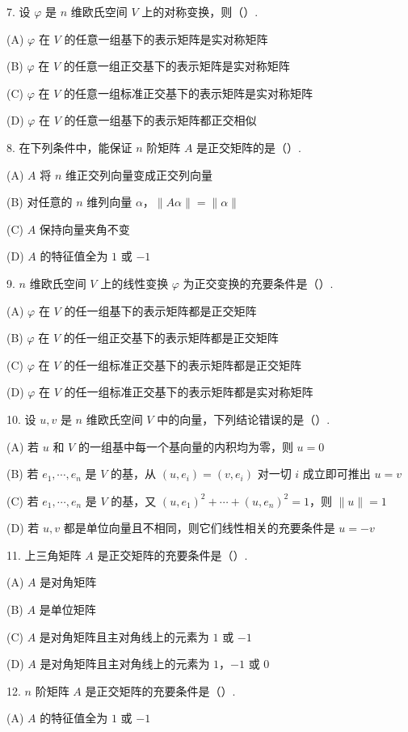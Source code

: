 \documentclass[UTF8,12pt,a4paper,fontset=fandol]{ctexart}
\begin{document}
7. 设 $\varphi$ 是 $n$ 维欧氏空间 $V$ 上的对称变换，则（\quad ）.

(A) $\varphi$ 在 $V$ 的任意一组基下的表示矩阵是实对称矩阵

(B) $\varphi$ 在 $V$ 的任意一组正交基下的表示矩阵是实对称矩阵

(C) $\varphi$ 在 $V$ 的任意一组标准正交基下的表示矩阵是实对称矩阵

(D) $\varphi$ 在 $V$ 的任意一组基下的表示矩阵都正交相似

8. 在下列条件中，能保证 $n$ 阶矩阵 $A$ 是正交矩阵的是（\quad ）.

(A) $A$ 将 $n$ 维正交列向量变成正交列向量

(B) 对任意的 $n$ 维列向量 $\alpha$，$\|A\alpha\|=\|\alpha\|$

(C) $A$ 保持向量夹角不变

(D) $A$ 的特征值全为 $1$ 或 $-1$

9. $n$ 维欧氏空间 $V$ 上的线性变换 $\varphi$ 为正交变换的充要条件是（\quad ）.

(A) $\varphi$ 在 $V$ 的任一组基下的表示矩阵都是正交矩阵

(B) $\varphi$ 在 $V$ 的任一组正交基下的表示矩阵都是正交矩阵

(C) $\varphi$ 在 $V$ 的任一组标准正交基下的表示矩阵都是正交矩阵

(D) $\varphi$ 在 $V$ 的任一组标准正交基下的表示矩阵都是实对称矩阵

10. 设 $u,v$ 是 $n$ 维欧氏空间 $V$ 中的向量，下列结论错误的是（\quad ）.

(A) 若 $u$ 和 $V$ 的一组基中每一个基向量的内积均为零，则 $u=0$

(B) 若 $e_1,\cdots,e_n$ 是 $V$ 的基，从 $(u,e_i)=(v,e_i)$ 对一切 $i$ 成立即可推出 $u=v$

(C) 若 $e_1,\cdots,e_n$ 是 $V$ 的基，又 $(u,e_1)^2+\cdots+(u,e_n)^2=1$，则 $\|u\|=1$

(D) 若 $u,v$ 都是单位向量且不相同，则它们线性相关的充要条件是 $u=-v$

11. 上三角矩阵 $A$ 是正交矩阵的充要条件是（\quad ）.

(A) $A$ 是对角矩阵

(B) $A$ 是单位矩阵

(C) $A$ 是对角矩阵且主对角线上的元素为 $1$ 或 $-1$

(D) $A$ 是对角矩阵且主对角线上的元素为 $1$，$-1$ 或 $0$

12. $n$ 阶矩阵 $A$ 是正交矩阵的充要条件是（\quad ）.

(A) $A$ 的特征值全为 $1$ 或 $-1$
\end{document}
